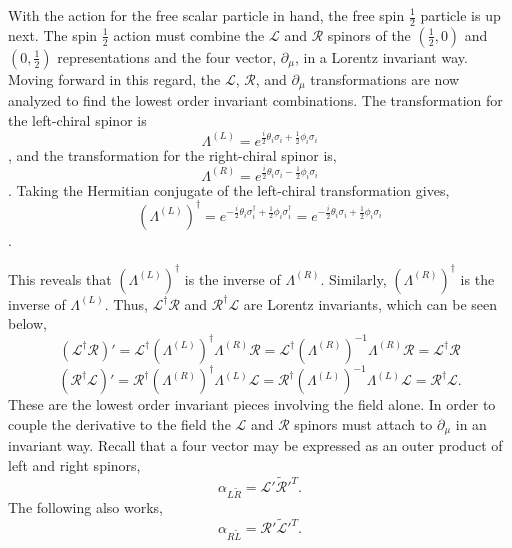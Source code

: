 With the action for the free scalar particle in hand, the free spin $\frac{1}{2}$ particle is up next. The spin $\frac{1}{2}$ action must combine the $\mathcal{L}$ and $\mathcal{R}$ spinors of the $(\frac{1}{2}, 0)$ and $(0, \frac{1}{2})$ representations and the four vector, $\partial_\mu$, in a Lorentz invariant way. Moving forward in this regard, the $\mathcal{L}$, $\mathcal{R}$, and $\partial_\mu$ transformations are now analyzed to find the lowest order invariant combinations. The transformation for the left-chiral spinor is 
\begin{equation}
\Lambda^{(L)} = e^{\frac{i}{2}\theta_i \sigma_i + \frac{1}{2}\phi_i \sigma_i}
\end{equation},
and the transformation for the right-chiral spinor is,
\begin{equation}
\Lambda^{(R)} = e^{\frac{i}{2}\theta_i \sigma_i - \frac{1}{2}\phi_i \sigma_i}
\end{equation}.
Taking the Hermitian conjugate of the left-chiral transformation gives,
\begin{equation}
(\Lambda^{(L)})^\dagger = e^{-\frac{i}{2}\theta_i \sigma_i^\dagger + \frac{1}{2}\phi_i \sigma_i^\dagger} 
= e^{-\frac{i}{2}\theta_i \sigma_i + \frac{1}{2}\phi_i \sigma_i}
\end{equation}.

This reveals that $(\Lambda^{(L)})^\dagger$ is the inverse of $\Lambda^{(R)}$. Similarly, $(\Lambda^{(R)})^\dagger$ is the inverse of $\Lambda^{(L)}$. Thus, $\mathcal{L}^\dagger\mathcal{R}$ and $\mathcal{R}^\dagger\mathcal{L}$ are Lorentz invariants, which can be seen below,
\begin{equation}
(\mathcal{L}^\dagger\mathcal{R})' = \mathcal{L}^\dagger (\Lambda^{(L)})^\dagger \Lambda^{(R)} \mathcal{R} 
= \mathcal{L}^\dagger (\Lambda^{(R)})^{-1} \Lambda^{(R)} \mathcal{R} = \mathcal{L}^\dagger \mathcal{R}  
\end{equation}
\begin{equation}
(\mathcal{R}^\dagger\mathcal{L})' = \mathcal{R}^\dagger (\Lambda^{(R)})^\dagger \Lambda^{(L)} \mathcal{L} 
= \mathcal{R}^\dagger (\Lambda^{(L)})^{-1} \Lambda^{(L)} \mathcal{L} = \mathcal{R}^\dagger \mathcal{L}. 
\end{equation}
These are the lowest order invariant pieces involving the field alone. In order to couple the derivative to the field the $\mathcal{L}$ and $\mathcal{R}$ spinors must attach to $\partial_\mu$ in an invariant way. Recall that a four vector may be expressed as an outer product of left and right spinors, 
\begin{equation}
\alpha_{L\tilde{R}} = \mathcal{L}' \tilde{\mathcal{R}}'^{T}.
\end{equation}
The following also works, 
\begin{equation}
\alpha_{R\tilde{L}} = \mathcal{R}' \tilde{\mathcal{L}}'^{T}.
\end{equation}

